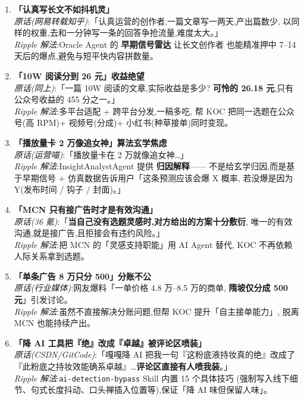 \begin{enumerate}[leftmargin=*]

\item \textbf{「认真写长文不如抖机灵」}\\
\textit{原话(网易转载知乎)}:「认真运营的创作者,一篇文章写一两天,产出篇数少,
以同样的权重,去和一分钟写一条的回答争抢流量,难度太大。」\\
\textit{Ripple 解法}:Oracle Agent 的 \textbf{早期信号雷达} 让长文创作者
也能精准押中 7--14 天后的爆点,避免与短平快内容拼数量。

\item \textbf{「10W 阅读分到 26 元」收益绝望}\\
\textit{原话(同上)}:「一篇 10W 阅读的文章,实际收益是多少?
\textbf{可怜的 26.18 元},只有公众号收益的 455 分之一。」\\
\textit{Ripple 解法}:多平台适配 + 跨平台分发,一稿多吃,
帮 KOC 把同一选题在公众号(高 RPM)+ 视频号(分成)+ 小红书(种草接单)同时变现。

\item \textbf{「播放量卡 2 万像追女神」算法玄学焦虑}\\
\textit{原话(运营喵)}:「播放量卡在 2 万就像追女神\dots」\\
\textit{Ripple 解法}:InsightAnalystAgent 提供 \textbf{归因解释}——
不是给玄学归因,而是基于早期信号 + 仿真数据告诉用户「这条预测应该会爆 X 概率,
若没爆是因为 Y(发布时间 / 钩子 / 封面)。」

\item \textbf{「MCN 只有接广告时才是有效沟通」}\\
\textit{原话(36 氪)}:「\textbf{当自己没有选题灵感时,对方给出的方案十分敷衍},
唯一的有效沟通,就是接广告,且拒接会有违约风险。」\\
\textit{Ripple 解法}:把 MCN 的「灵感支持职能」用 AI Agent 替代,
KOC 不再依赖人际关系拿到选题。

\item \textbf{「单条广告 8 万只分 500」分账不公}\\
\textit{原话(行业媒体)}:网友爆料「一单价格 4.8 万--8.5 万的商单,
\textbf{隋坡仅分成 500 元}」引发讨论。\\
\textit{Ripple 解法}:虽然不直接解决分账问题,但帮 KOC 提升「自主接单能力」,
脱离 MCN 也能持续产出。

\item \textbf{「降 AI 工具把『绝』改成『卓越』被评论区喷装」}\\
\textit{原话(CSDN/GitCode)}:「嘎嘎降 AI 把我一句『这粉底液持妆真的绝』改成了
『此粉底之持妆效能确系卓越』\dots\textbf{评论区直接有人喷我装}。」\\
\textit{Ripple 解法}:\texttt{ai-detection-bypass} Skill 内置 15 个具体技巧
(强制写入线下细节、句式长度抖动、口头禅插入位置等),保证「降 AI 味但保留人味」。


\end{enumerate}
